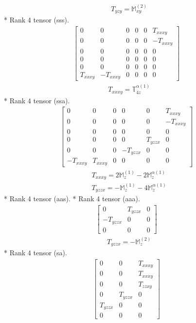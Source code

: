 \documentclass[fleqn,8pt,landscape]{jsarticle}
\begin{document}
\begin{align*}
& T_{yzy} = \mathbb{M}_{xy}^{(2)}
\end{align*}
* Rank 4 tensor (sss).
\begin{align*}
\begin{bmatrix} 0 & 0 & 0 & 0 & 0 & T_{xxxy} \\ 0 & 0 & 0 & 0 & 0 & - T_{xxxy} \\ 0 & 0 & 0 & 0 & 0 & 0 \\ 0 & 0 & 0 & 0 & 0 & 0 \\ 0 & 0 & 0 & 0 & 0 & 0 \\ T_{xxxy} & - T_{xxxy} & 0 & 0 & 0 & 0 \end{bmatrix}
\end{align*}
\begin{align*}
& T_{xxxy} = \mathbb{T}_{4z}^{\alpha(1)}
\end{align*}
* Rank 4 tensor (ssa).
\begin{align*}
\begin{bmatrix} 0 & 0 & 0 & 0 & 0 & T_{xxxy} \\ 0 & 0 & 0 & 0 & 0 & - T_{xxxy} \\ 0 & 0 & 0 & 0 & 0 & 0 \\ 0 & 0 & 0 & 0 & T_{yzzx} & 0 \\ 0 & 0 & 0 & - T_{yzzx} & 0 & 0 \\ - T_{xxxy} & T_{xxxy} & 0 & 0 & 0 & 0 \end{bmatrix}
\end{align*}
\begin{align*}
& T_{xxxy} = 2 \mathbb{M}_{z}^{(1)} - 2 \mathbb{M}_{z}^{\alpha(1)} \\
& T_{yzzx} = - \mathbb{M}_{z}^{(1)} - 4 \mathbb{M}_{z}^{\alpha(1)}
\end{align*}
* Rank 4 tensor (aas).
* Rank 4 tensor (aaa).
\begin{align*}
\begin{bmatrix} 0 & T_{yzzx} & 0 \\ - T_{yzzx} & 0 & 0 \\ 0 & 0 & 0 \end{bmatrix}
\end{align*}
\begin{align*}
& T_{yzzx} = - \mathbb{M}_{z}^{(2)}
\end{align*}
* Rank 4 tensor (sa).
\begin{align*}
\begin{bmatrix} 0 & 0 & T_{xxxy} \\ 0 & 0 & T_{xxxy} \\ 0 & 0 & T_{zzxy} \\ 0 & T_{yzzx} & 0 \\ T_{yzzx} & 0 & 0 \\ 0 & 0 & 0 \end{bmatrix}
\end{align*}
\end{document}
